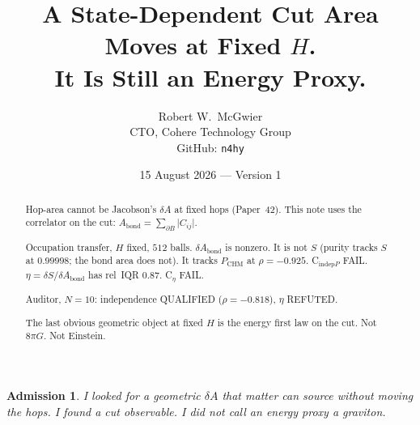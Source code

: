 \documentclass[11pt]{article}
\title{\textbf{A State-Dependent Cut Area Moves at Fixed $H$.\\
It Is Still an Energy Proxy.}}
\author{Robert W.\ McGwier\\
\small CTO, Cohere Technology Group\\
\small GitHub: \texttt{n4hy}}
\date{15 August 2026 --- Version 1}
\newtheorem*{admission}{Admission}
\begin{document}
\maketitle

\begin{abstract}
\noindent
Hop-area cannot be Jacobson's $\delta A$ at fixed hops
(Paper~42). This note uses the correlator on the cut:
$A_{\mathrm{bond}}=\sum_{\partial B}\lvert C_{ij}\rvert$.

Occupation transfer, $H$ fixed, $512$ balls.
$\delta A_{\mathrm{bond}}$ is nonzero.
It is not $S$ (purity tracks $S$ at $0.99998$; the bond
area does not). It tracks $P_{\mathrm{CHM}}$ at
$\rho=-0.925$. C$_{\mathrm{indep}P}$ FAIL.
$\eta=\delta S/\delta A_{\mathrm{bond}}$ has rel~IQR $0.87$.
C$_\eta$ FAIL.

Auditor, $N=10$: independence QUALIFIED ($\rho=-0.818$),
$\eta$ REFUTED.

The last obvious geometric object at fixed $H$ is the
energy first law on the cut. Not $8\pi G$. Not Einstein.
\end{abstract}

\begin{admission}
I looked for a geometric $\delta A$ that matter can source
without moving the hops. I found a cut observable. I did
not call an energy proxy a graviton.
\end{admission}
\end{document}
